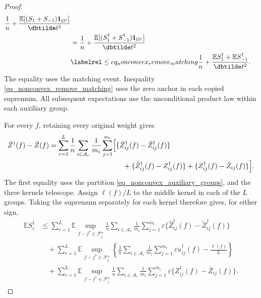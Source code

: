 \documentclass[twoside,11pt]{article}
\newenvironment{revision}{\color{revisionred}}{}
\begin{document}
\begin{revision}
\begin{proof}
\begin{align*}
\frac1n+\frac{\mathbb E[(S_1+S_{-1})
                              \mathbf1_{\Omega^\dagger}]}{\dbtilde t^2}\\
&=\frac1n+\frac{\mathbb E[(S_1^\dagger+S_{-1}^\dagger)
                              \mathbf1_{\Omega^\dagger}]}{\dbtilde t^2}\\
&\labelrel\leq{eq_nonconvex_remove_matching}
\frac1n+\frac{\mathbb E S_1^\dagger+
                       \mathbb E S_{-1}^\dagger}{\dbtilde t^2}.
\end{align*}
The equality uses the matching event.
Inequality \eqref{eq_nonconvex_remove_matching} uses the zero
anchor in each copied supremum. All subsequent expectations use
the unconditional product law within each auxiliary group.

For every $f$, retaining every original weight gives
\begin{align*}
\hat Z^\dagger(f)-\bar Z(f)
&=\sum_{r=1}^L\frac1n\sum_{i\in\mathcal A_r}\frac1{m_i}
\sum_{j=1}^{m_i}
\Bigl[
\{\hat Z_{ij}^\dagger(f)-\tilde Z_{ij}^\dagger(f)\}\\
&\hspace{105pt}+
\{\tilde Z_{ij}^\dagger(f)-Z_{ij}^\dagger(f)\}
+\{Z_{ij}^\dagger(f)-\bar Z_{ij}(f)\}
\Bigr].
\end{align*}
The first equality uses the partition
\eqref{eq_nonconvex_auxiliary_groups}, and the three kernels
telescope. Assign $\ell(f)/L$ to the middle kernel in each of
the $L$ groups. Taking the supremum separately for each kernel
therefore gives, for either sign,
\begin{align*}
\mathbb E S_\varepsilon^\dagger
&\leq\sum_{r=1}^L
\mathbb E\sup_{f-f^*\in\mathcal F_{\tilde t}^{\star}}
\frac1n\sum_{i\in\mathcal A_r}\frac1{m_i}\sum_{j=1}^{m_i}
\varepsilon\{\hat Z_{ij}^\dagger(f)-\tilde Z_{ij}^\dagger(f)\}\\
&\quad+\sum_{r=1}^L
\mathbb E\sup_{f-f^*\in\mathcal F_{\tilde t}^{\star}}
\left\{\frac1n\sum_{i\in\mathcal A_r}\frac1{m_i}\sum_{j=1}^{m_i}
\varepsilon u_{ij}^\dagger(f)-\frac{\ell(f)}{L}\right\}\\
&\quad+\sum_{r=1}^L
\mathbb E\sup_{f-f^*\in\mathcal F_{\tilde t}^{\star}}
\frac1n\sum_{i\in\mathcal A_r}\frac1{m_i}\sum_{j=1}^{m_i}
\varepsilon\{Z_{ij}^\dagger(f)-\bar Z_{ij}(f)\}.
\end{align*}


\end{proof}
\end{revision}
\end{document}
